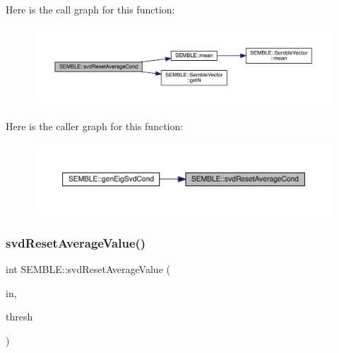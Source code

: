 Here is the call graph for this function\+:
\nopagebreak
\begin{figure}[H]
\begin{center}
\leavevmode
\includegraphics[width=350pt]{d7/dfd/namespaceSEMBLE_a63cc1ba6c9e1c57e90030d6128a4642a_cgraph}
\end{center}
\end{figure}
Here is the caller graph for this function\+:
\nopagebreak
\begin{figure}[H]
\begin{center}
\leavevmode
\includegraphics[width=350pt]{d7/dfd/namespaceSEMBLE_a63cc1ba6c9e1c57e90030d6128a4642a_icgraph}
\end{center}
\end{figure}
\mbox{\label{namespaceSEMBLE_a5a99b05753b531606137646e96ee12ff}} 
\subsubsection{\texorpdfstring{svdResetAverageValue()}{svdResetAverageValue()}}
{\footnotesize\ttfamily int S\+E\+M\+B\+L\+E\+::svd\+Reset\+Average\+Value (\begin{DoxyParamCaption}\item[{const \mbox{\hyperlink{structSEMBLE_1_1SembleVector}{Semble\+Vector}}$<$ double $>$ \&}]{in,  }\item[{const double}]{thresh }\end{DoxyParamCaption})}

